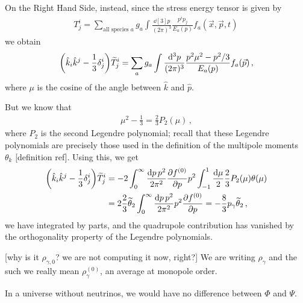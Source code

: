 \documentclass[main.tex]{subfiles}
\begin{document}

On the Right Hand Side, instead, since the stress energy tensor is given by 
%
\begin{align}
T^{i}_{j} = \sum _{\text{all species \(a\)}} g_{a}
\int  \frac{ \dd[3]{p}}{(2 \pi )^3} 
\frac{p^{i}p_{j}}{E_{a}(p)} f_a (\vec{x}, \vec{p}, t)
\,
\end{align}
%
we obtain 
%
\begin{align}
\qty(\hat{k}_{i} \hat{k}^{j} - \frac{1}{3} \delta^{i}_{j})
\widetilde{T}^{i}_{j} 
= \sum _{a} g_{a} \int  \frac{\dd[3]{p}}{(2\pi )^3} \frac{p^2\mu^2 - p^2/3}{E_a (p)} f_a (\vec{p})
\,,
\end{align}
%
where \(\mu \) is the cosine of the angle between \(\hat{k}\) and \(\hat{p}\). 

But we know that 
%
\begin{align}
\mu^2 - \frac{1}{3} = \frac{2}{3} P_2 (\mu )
\,,
\end{align}
%
where \(P_2\) is the second Legendre polynomial; recall that these Legendre polynomials are precisely those used in the definition of the multipole moments \(\theta_{k}\) [definition ref].
Using this, we get 
%
\begin{subequations}
\begin{align}
\qty(\hat{k}_{i} \hat{k}^{j} - \frac{1}{3} \delta^{i}_{j})
\widetilde{T}^{i}_{j} &=
-2 \int_{0}^{ \infty } \frac{ \dd{p} p^2}{2\pi^2} \pdv{f^{(0)}}{p}p^2
\int_{-1}^{1} \frac{ \dd{\mu }}{2} \frac{2}{3} P_2 (\mu ) \theta (\mu )  \\
&= 2 \frac{2}{3} \widetilde{\theta}_{2} \int_{0}^{ \infty } \frac{ \dd{p}p^2}{2 \pi^2} p^2 \pdv{f^{(0)}}{p} = - \frac{8}{3} p_{\gamma } \widetilde{\theta}_{2}
\,,
\end{align}
\end{subequations}
%
we have integrated by parts, and the quadrupole contribution has vanished by the orthogonality property of the Legendre polynomials.

[why is it \(\rho_{\gamma, 0}\)? we are not computing it now, right?]
We are writing \(\rho_{\gamma }\) and the such we really mean \(\rho_{\gamma }^{(0)}\), an average at monopole order. 

In a universe without neutrinos, we would have no difference between \(\Phi \) and \(\Psi \). 

\end{document}
